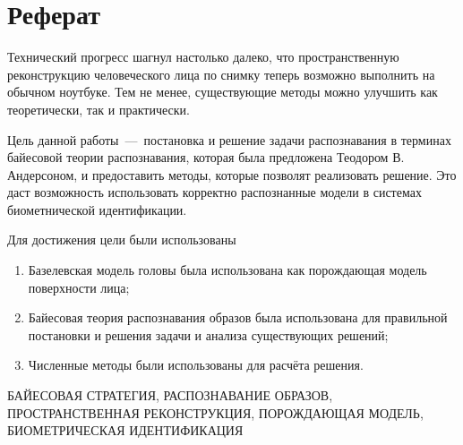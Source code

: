 \chapter*{Реферат}

Технический прогресс шагнул настолько далеко,
что пространственную реконструкцию человеческого лица по снимку
теперь возможно выполнить на обычном ноутбуке.
Тем не менее,
существующие методы можно улучшить как теоретически, так и практически.

Цель данной работы~---~постановка и решение задачи распознавания
в терминах байесовой теории распознавания,
которая была предложена Теодором В. Андерсоном,
и предоставить методы, которые позволят реализовать решение.
Это даст возможность использовать корректно распознанные модели
в системах биометнической идентификации.

Для достижения цели были использованы
\begin{enumerate}
  \item
    Базелевская модель головы была использована
    как порождающая модель поверхности лица;
  \item
    Байесовая теория распознавания образов была использована
    для правильной постановки и решения задачи и анализа существующих решений;
  \item
    Численные методы были использованы для расчёта решения.
\end{enumerate}

\MakeUppercase{байесовая стратегия, распознавание образов,
пространственная реконструкция, порождающая модель,
биометрическая идентификация}
